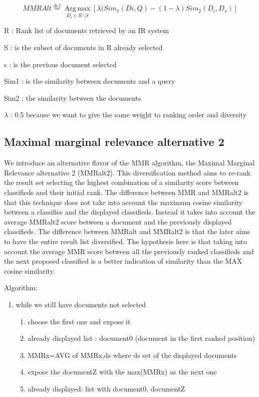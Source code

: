 \begin{equation}
MMRAlt\overset{def}{=}\operatorname*{Arg \, \max}_{D_{i}\in R\ \setminus S}[\lambda(Sim_{1}(Di,Q)-(1-\lambda) Sim_{2}(D_{i},D_{s})]
\end{equation}

R : Rank list of documents retrieved by an IR system

S : is the subset of documents in R already selected

s : is the previous document selected

Sim1 : is the similarity between documents and a query

Sim2 : the similarity between the documents

$\lambda$ : 0.5 because we want to give the same weight to ranking order and diversity



\subsection{Maximal marginal relevance alternative 2}

We introduce an alternative flavor of the MMR algorithm, the Maximal Marginal Relevance alternative 2 (MMRalt2). This diversification method aims to re-rank the result set selecting the highest combination of a similarity score between classifieds and their initial rank. The difference between MMR and MMRalt2 is that this technique does not take into account the maximum cosine similarity between a classifies and the displayed classifieds. Instead it takes into account the average MMRalt2 score between a document and the previously displayed classifieds. The difference between MMRalt and MMRalt2 is that the later aims to have the entire result list diversified. The hypothesis here is that taking into account the average MMR score between all the previously ranked classifieds and the next proposed classified is a better indication of similarity than the MAX cosine similarity. 

Algorithm:

\begin{enumerate}
\item while we still have documents not selected
	\begin{enumerate}
	\item choose the first one and expose it
	\item already displayed list : document0 (document in the first ranked position)
	\item MMRx=AVG of MMRx,ds where ds set of the displayed documents
	\item expose the documentZ with the max(MMRx) as the next one
	\item already displayed: list with document0, documentZ
	\end{enumerate}
\end{enumerate}

